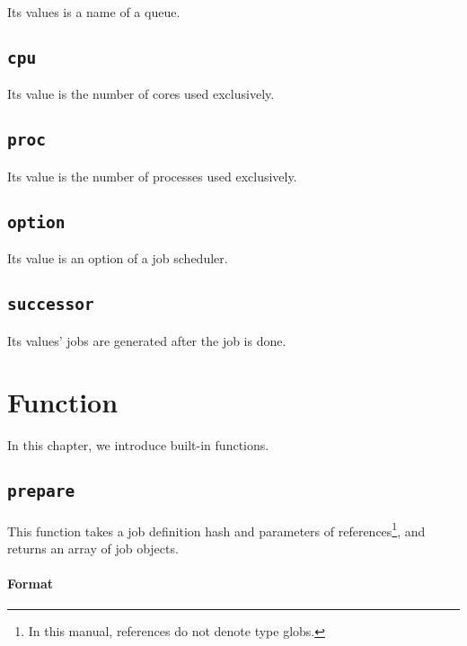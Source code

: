 \documentclass[a4paper,10pt]{report}
\begin{document}
Its values is a name of a queue.

\section{\texttt{cpu}}

Its value is the number of cores used exclusively.

\section{\texttt{proc}}

Its value is the number of processes used exclusively.

\section{\texttt{option}}

Its value is an option of a job scheduler.

\section{\texttt{successor}}

Its values' jobs are generated after the job is done.
\fi

\chapter{Function}\label{chapfun}

In this chapter, we introduce built-in functions.

\def\format{Format}
\def\example{Example}
\def\advanced{Advanced}

\section{\texttt{prepare}}\label{sec:prepare}

This function takes a job definition hash and parameters of
references\footnote{In this manual, references do not denote type
globs.}, and returns an array of job objects.


\subsubsection{\format}
\end{document}
